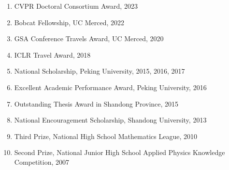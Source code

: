 \documentclass[letterpaper]{article}
\def\footerlink{http://jblevins.org/projects/cv-template/}
\begin{document}
\begin{enumerate}

\item CVPR Doctoral Consortium Award, 2023

\item Bobcat Fellowship, UC Merced, 2022

\item GSA Conference Travels Award, UC Merced, 2020

\item ICLR Travel Award, 2018

\item National Scholarship, Peking University, 2015, 2016, 2017

\item Excellent Academic Performance Award, Peking University, 2016

\item Outstanding Thesis Award in Shandong Province, 2015

\item National Encouragement Scholarship, Shandong University, 2013

\item Third Prize, National High School Mathematics League, 2010

\item Second Prize, National Junior High School Applied Physics Knowledge Competition, 2007


\end{enumerate}


\bigskip

\end{document}

